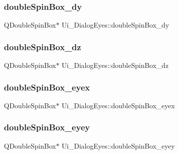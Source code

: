 \subsubsection{\texorpdfstring{double\+Spin\+Box\+\_\+dy}{doubleSpinBox\_dy}}
{\footnotesize\ttfamily Q\+Double\+Spin\+Box$\ast$ Ui\+\_\+\+Dialog\+Eyes\+::double\+Spin\+Box\+\_\+dy}

\hypertarget{class_ui___dialog_eyes_a82dfb342b687d0b2a377eb1f77c9682a}{}\label{class_ui___dialog_eyes_a82dfb342b687d0b2a377eb1f77c9682a} 
\subsubsection{\texorpdfstring{double\+Spin\+Box\+\_\+dz}{doubleSpinBox\_dz}}
{\footnotesize\ttfamily Q\+Double\+Spin\+Box$\ast$ Ui\+\_\+\+Dialog\+Eyes\+::double\+Spin\+Box\+\_\+dz}

\hypertarget{class_ui___dialog_eyes_aef63991da52508c1b8c4c187cc426626}{}\label{class_ui___dialog_eyes_aef63991da52508c1b8c4c187cc426626} 
\subsubsection{\texorpdfstring{double\+Spin\+Box\+\_\+eyex}{doubleSpinBox\_eyex}}
{\footnotesize\ttfamily Q\+Double\+Spin\+Box$\ast$ Ui\+\_\+\+Dialog\+Eyes\+::double\+Spin\+Box\+\_\+eyex}

\hypertarget{class_ui___dialog_eyes_a0f2e95f66886cb79ba533a3d50501157}{}\label{class_ui___dialog_eyes_a0f2e95f66886cb79ba533a3d50501157} 
\subsubsection{\texorpdfstring{double\+Spin\+Box\+\_\+eyey}{doubleSpinBox\_eyey}}
{\footnotesize\ttfamily Q\+Double\+Spin\+Box$\ast$ Ui\+\_\+\+Dialog\+Eyes\+::double\+Spin\+Box\+\_\+eyey}

